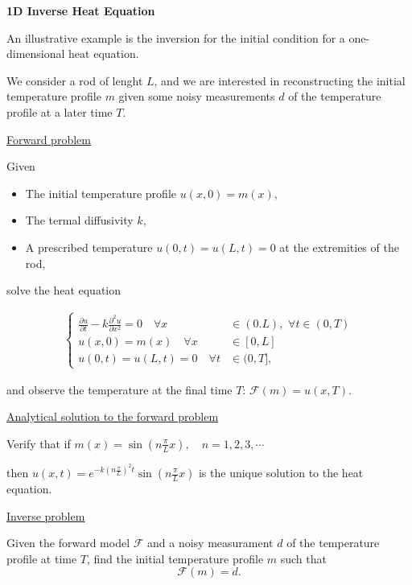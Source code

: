 \documentclass{beamer}
\begin{document}
\begin{frame}
\begin{center}
\large{\textbf{\color{red} 1D Inverse Heat Equation}}
\end{center}

An illustrative example is the inversion for the initial condition for a one-dimensional heat equation.

We consider a rod of lenght $L$,  and we are interested in reconstructing the initial temperature profile $m$ given some noisy measurements $d$ of the temperature profile at a later time $T$. \\
\end{frame}

\begin{frame}
{\color{red}\underline{ Forward problem}}

Given

\begin{itemize}
\item The initial temperature profile $u(x,0)=m(x)$,
\item The termal diffusivity $k$,
\item A prescribed temperature $u(0,t)=u(L,t)=0$ at the extremities of the rod,
\end{itemize}
solve the heat equation

\begin{eqnarray*}
\left\{
\begin{aligned}
\frac{\partial u}{\partial t} - k \frac{\partial ^2 u}{\partial x^2} = 0  \quad \forall x &\in (0.L), \,\, \forall t \in (0,T) \\
u(x,0) = m(x) \quad \forall x &\in [0,L] \\
u(0,t)=u(L,t) = 0 \quad \forall t &\in (0,T],
\end{aligned}
\right.
\end{eqnarray*}

and observe the temperature at the final time $T$: $\mathcal{F}(m)=u(x,T).$ \\
\end{frame}

\begin{frame}
{\color{red} \underline{Analytical solution to the forward problem}}

Verify that if $m(x)=\sin(n\frac{\pi}{L}x), \quad n=1,2,3, \cdots$

then $u(x,t)=e^{-k(n \frac{\pi}{L})^2t} \sin(n\frac{\pi}{L}x)$ is the unique solution to the heat equation.  \\

\vspace{0.5cm}

{\color{red} \underline{Inverse problem} }

Given the forward model $\mathcal{F}$ and a noisy measurament $d$ of the temperature profile at time $T$, find the initial temperature profile $m$ such that
$$\mathcal{F}(m)=d.$$
\end{frame}
\end{document}
